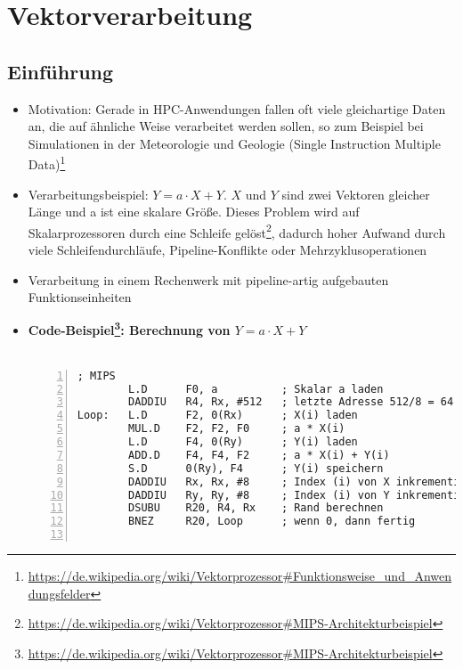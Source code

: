\section{Vektorverarbeitung}

\subsection{Einführung}
\begin{itemize}
	\item Motivation: Gerade in HPC-Anwendungen fallen oft viele gleichartige Daten an, die auf ähnliche Weise verarbeitet werden sollen, so zum Beispiel bei Simulationen in der Meteorologie und Geologie (Single Instruction Multiple Data)\footnote{\url{https://de.wikipedia.org/wiki/Vektorprozessor\#Funktionsweise_und_Anwendungsfelder}}
	\item Verarbeitungsbeispiel: \(Y = a \cdot X + Y\). \(X\) und \(Y\) sind zwei Vektoren gleicher Länge und a ist eine skalare Größe. Dieses Problem wird auf Skalarprozessoren durch eine Schleife gelöst\footnote{\url{https://de.wikipedia.org/wiki/Vektorprozessor\#MIPS-Architekturbeispiel}}, dadurch hoher Aufwand durch viele Schleifendurchläufe, Pipeline-Konflikte oder Mehrzyklusoperationen
	\item Verarbeitung in einem Rechenwerk mit pipeline-artig aufgebauten Funktionseinheiten
	\item \textbf{Code-Beispiel\footnote{\url{https://de.wikipedia.org/wiki/Vektorprozessor\#MIPS-Architekturbeispiel}}: Berechnung von \(Y = a \cdot X + Y\)}\\\\
	\begin{minipage}{\linewidth}
	\begin{lstlisting}[frame=single,numbers=left,mathescape,language={[mips]Assembler},tabsize=4]
; MIPS
		L.D 	 F0, a          ; Skalar a laden
		DADDIU	 R4, Rx, #512   ; letzte Adresse 512/8 = 64
Loop:	L.D 	 F2, 0(Rx)  	; X(i) laden
		MUL.D    F2, F2, F0     ; a * X(i)
		L.D      F4, 0(Ry)      ; Y(i) laden
		ADD.D    F4, F4, F2     ; a * X(i) + Y(i)
		S.D      0(Ry), F4      ; Y(i) speichern
		DADDIU   Rx, Rx, #8     ; Index (i) von X inkrementieren
		DADDIU   Ry, Ry, #8     ; Index (i) von Y inkrementieren
		DSUBU    R20, R4, Rx    ; Rand berechnen
		BNEZ     R20, Loop      ; wenn 0, dann fertig


\end{lstlisting}
\end{minipage}
\end{itemize}
